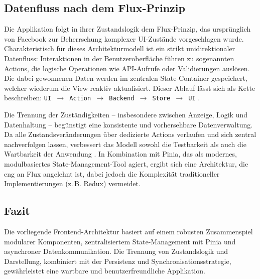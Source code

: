 \subsection{Datenfluss nach dem Flux-Prinzip}

Die Applikation folgt in ihrer Zustandslogik dem Flux-Prinzip, das ursprünglich von Facebook zur Beherrschung komplexer UI-Zustände vorgeschlagen wurde. Charakteristisch für dieses Architekturmodell ist ein strikt unidirektionaler Datenfluss: Interaktionen in der Benutzeroberfläche führen zu sogenannten Actions, die logische Operationen wie API-Aufrufe oder Validierungen auslösen. Die dabei gewonnenen Daten werden im zentralen State-Container gespeichert, welcher wiederum die View reaktiv aktualisiert. Dieser Ablauf lässt sich als Kette beschreiben: \texttt{UI $\rightarrow$ Action $\rightarrow$ Backend $\rightarrow$ Store $\rightarrow$ UI} \cite{Flux, facebook_flux}.

Die Trennung der Zuständigkeiten – insbesondere zwischen Anzeige, Logik und Datenhaltung – begünstigt eine konsistente und vorhersehbare Datenverwaltung. Da alle Zustandsveränderungen über dedizierte Actions verlaufen und sich zentral nachverfolgen lassen, verbessert das Modell sowohl die Testbarkeit als auch die Wartbarkeit der Anwendung \cite{Flux}. In Kombination mit Pinia, das als modernes, modulbasiertes State-Management-Tool agiert, ergibt sich eine Architektur, die eng an Flux angelehnt ist, dabei jedoch die Komplexität traditioneller Implementierungen (z.\,B. Redux) vermeidet.

 \subsection{Fazit}
 Die vorliegende Frontend-Architektur basiert auf einem robusten Zusammenspiel modularer Komponenten, zentralisiertem State-Management mit Pinia und asynchroner Datenkommunikation. Die Trennung von Zustandslogik und Darstellung, kombiniert mit der Persistenz und Synchronisationsstrategie, gewährleistet eine wartbare und benutzerfreundliche Applikation.
 
 